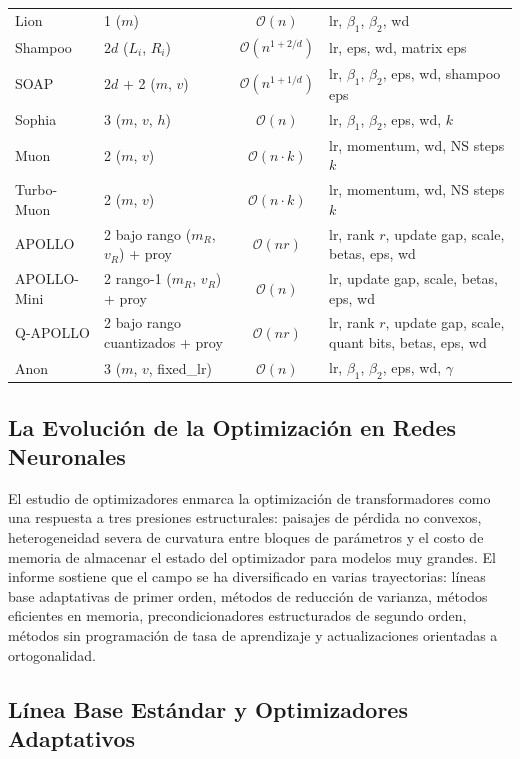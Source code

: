 \documentclass[11pt,a4paper]{article}
\begin{document}
\begin{longtable}{llcl}
Lion & 1 ($m$) & $\mathcal{O}(n)$ & lr, $\beta_1$, $\beta_2$, wd \\
Shampoo & $2d$ ($L_i$, $R_i$) & $\mathcal{O}(n^{1+2/d})$ & lr, eps, wd, matrix eps \\
SOAP & $2d$ + 2 ($m$, $v$) & $\mathcal{O}(n^{1+1/d})$ & lr, $\beta_1$, $\beta_2$, eps, wd, shampoo eps \\
Sophia & 3 ($m$, $v$, $h$) & $\mathcal{O}(n)$ & lr, $\beta_1$, $\beta_2$, eps, wd, $k$ \\
Muon & 2 ($m$, $v$) & $\mathcal{O}(n \cdot k)$ & lr, momentum, wd, NS steps $k$ \\
Turbo-Muon & 2 ($m$, $v$) & $\mathcal{O}(n \cdot k)$ & lr, momentum, wd, NS steps $k$ \\
APOLLO & 2 bajo rango ($m_R$, $v_R$) + proy & $\mathcal{O}(nr)$ & lr, rank $r$, update gap, scale, betas, eps, wd \\
APOLLO-Mini & 2 rango-1 ($m_R$, $v_R$) + proy & $\mathcal{O}(n)$ & lr, update gap, scale, betas, eps, wd \\
Q-APOLLO & 2 bajo rango cuantizados + proy & $\mathcal{O}(nr)$ & lr, rank $r$, update gap, scale, quant bits, betas, eps, wd \\
Anon & 3 ($m$, $v$, fixed\_lr) & $\mathcal{O}(n)$ & lr, $\beta_1$, $\beta_2$, eps, wd, $\gamma$ \\
\end{longtable}

\subsection{La Evolución de la Optimización en Redes Neuronales}
El estudio de optimizadores enmarca la optimización de transformadores como una respuesta a tres presiones estructurales: paisajes de pérdida no convexos, heterogeneidad severa de curvatura entre bloques de parámetros y el costo de memoria de almacenar el estado del optimizador para modelos muy grandes. El informe sostiene que el campo se ha diversificado en varias trayectorias: líneas base adaptativas de primer orden, métodos de reducción de varianza, métodos eficientes en memoria, precondicionadores estructurados de segundo orden, métodos sin programación de tasa de aprendizaje y actualizaciones orientadas a ortogonalidad.

\subsection{Línea Base Estándar y Optimizadores Adaptativos}
\end{document}
